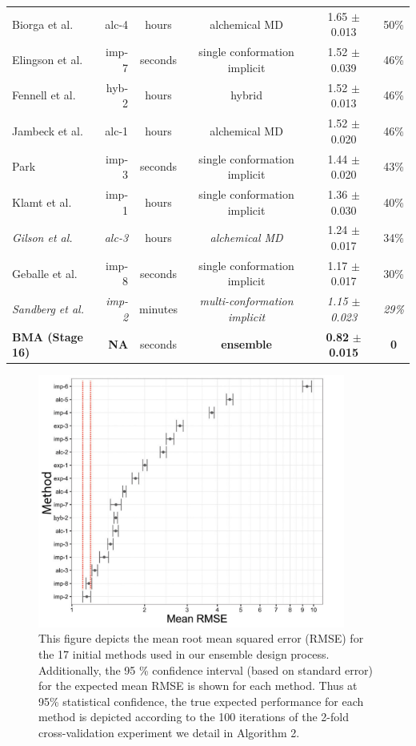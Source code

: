 \documentclass[journal=jpcbfk, manuscript=article]{achemso}
\newcommand{\+}[1]{\ensuremath{\mathbf{#1}}}
\begin{document}
\begin{table}[t]
\begin{tabular}{l|r|c|c|c|c}
		Biorga et al.~\cite{Beckstein:2012,Beckstein:2014} & alc-4& hours & alchemical MD & 1.65 $\pm$ 0.013 & 50\%\\ 
		Elingson et al.~\cite{Ellingson:2014} & imp-7 &seconds & single conformation implicit & 1.52 $\pm$ 0.039 & 46\%\\
		Fennell et al.~\cite{Li:2014} & hyb-2 & hours & hybrid & 1.52 $\pm$ 0.013 & 46\%\\																
		Jambeck et al.~\cite{Jambeck:2013} & alc-1&hours  & alchemical MD & 1.52 $\pm$ 0.020 & 46\%\\ 
		Park~\cite{Park:2014} & imp-3 &seconds  & single conformation implicit & 1.44 $\pm$ 0.020 & 43\%\\
		Klamt et al.~\cite{Klamt:2010} & imp-1 &hours & single conformation implicit & 1.36 $\pm$ 0.030 & 40\%\\	
		\textit{Gilson et al.~\cite{Muddana:2014}} & \textit{alc-3} & hours & \textit{alchemical MD} & {1.24 $\pm$ 0.017} & {34\%} \\ 
		Geballe et al.~\cite{Ellingson:2014} & imp-8 & seconds & single conformation implicit & 1.17 $\pm$ 0.017 & 30\%\\
		\textit{Sandberg et al.~\cite{Sandberg:2013}} & \textit{imp-2} &minutes  & \textit{multi-conformation implicit} & \textit{1.15 $\pm$ 0.023} & \textit{29\%}\\
		\textbf{BMA (Stage 16)} & \textbf{NA} & seconds & \textbf{ensemble} & \textbf{0.82} $\pm$ \textbf{0.015} & \textbf{0} \\
		\hline
	\end{tabular}
	\label{Analysis:Table1:Methods}
\end{table}
\begin{figure}[h!]
	\centering
	\includegraphics[keepaspectratio,width=0.9\textwidth]{Figures/Rev2/RMSE_SE}
	\caption{
	This figure depicts the mean root mean squared error (RMSE) for the 17 initial methods used in our ensemble design process.
	Additionally, the 95 \% confidence interval (based on standard error) for the expected mean RMSE is shown for each method. 
	Thus at 95\% statistical confidence, the true expected performance for each method is depicted according to the 100 iterations of the 2-fold cross-validation experiment we detail in Algorithm 2.}
	\label{Analysis:Figure1:Methods}
\end{figure}
\end{document}
